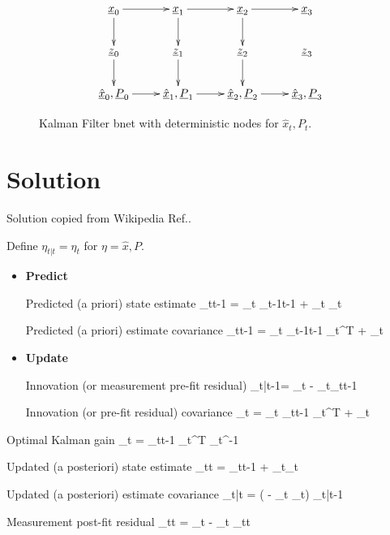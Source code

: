 \begin{figure}[h!]
\centering
$$\xymatrix{
\rvx_0\ar[d]\ar[r]&
\rvx_1\ar[d]\ar[r]&
\rvx_2\ar[d]\ar[r]&
\rvx_3\\
\rvz_0\ar[d]&
\rvz_1\ar[d]&
\rvz_2\ar[d]&
\rvz_3\\
\ul{\hat{x}}_0, 
\ul{P}_0\ar[r]&
\ul{\hat{x}}_1, 
\ul{P}_1\ar[r]&
\ul{\hat{x}}_2, 
\ul{P}_2\ar[r]&
\ul{\hat{x}}_3, 
\ul{P}_3
}$$
\caption{Kalman Filter bnet
with deterministic nodes for 
$\hat{x}_t, P_t$.}
\label{fig-kal-plus}
\end{figure}

\section{
Solution} 
Solution copied from 
Wikipedia Ref.\cite{wiki-kalman}.


Define $\eta_{t|t}=\eta_t$ for 
$\eta=\hat{x}, P$.

\begin{itemize}
\item{\bf Predict}

Predicted (a priori) state estimate
\beq
{}_{t\mid t-1} =
 _t
_{t-1\mid t-1}
 + _t _{t}
\eeq

Predicted (a priori) estimate covariance
\beq
{}_{t\mid t-1} =
 _t 
_{t-1\mid t-1}
 _t^\textsf{T} +
 _t
\eeq

\item{\bf Update}

Innovation (or measurement 
pre-fit residual)
\beq
{}_{t|t-1}= 
_t - 
_t_{t\mid t-1}
\eeq

Innovation (or pre-fit residual)
 covariance
\beq
{}_t = _t 
_{t\mid t-1} 
_t^\textsf{T} +
 _t
\eeq

\end{itemize}


Optimal Kalman gain
\beq
{}_t = _{t\mid t-1}
_t^\textsf{T}
 _t^{-1}
\eeq


Updated (a posteriori) state estimate
\beq
{}_{t\mid t} =
 _{t\mid t-1} +
 _t_t
\eeq

Updated (a posteriori) estimate covariance
\beq
{}_{t|t} = \left( -
 _t _t\right) 
_{t|t-1} 
\eeq

Measurement post-fit residual
\beq
{}_{t\mid t} =
 _t - _t
_{t\mid t}
\eeq